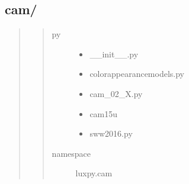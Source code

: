 \documentclass[letterpaper,10pt,english]{sphinxmanual}
\begin{document}
\begin{fulllineitems}
\begin{description}
\begin{quote}
\begin{description}
\end{description}\end{quote}

\end{description}

\end{fulllineitems}



\subsection{cam/}
\label{\detokenize{color:cam}}\begin{quote}
\begin{quote}\begin{description}
\item[{py}] \leavevmode\begin{itemize}
\item {} 
\_\_init\_\_.py

\item {} 
colorappearancemodels.py

\item {} 
cam\_02\_X.py

\item {} 
cam15u

\item {} 
sww2016.py

\end{itemize}

\item[{namespace}] \leavevmode
luxpy.cam

\end{description}\end{quote}
\end{quote}
\label{\detokenize{color:module-luxpy.color.cam}}
\end{document}
